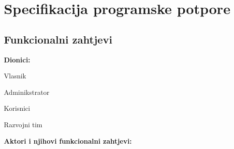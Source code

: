 \chapter{Specifikacija programske potpore}

\section{Funkcionalni zahtjevi}

    \noindent \textbf{Dionici:}

\begin{packed_enum}
	
	\item Vlasnik
	\item Adminikstrator				
	\item Korisnici
	\item Razvojni tim

	
\end{packed_enum}

\noindent \textbf{Aktori i njihovi funkcionalni zahtjevi:}


